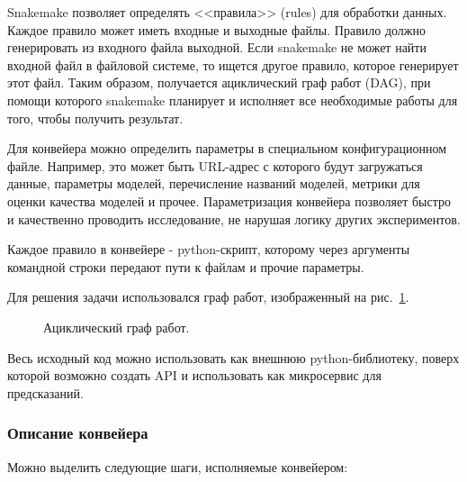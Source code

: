 \documentclass[a4paper,article,14pt]{extarticle}
\begin{document}
Snakemake позволяет определять <<правила>> (rules) для обработки данных.
Каждое правило может иметь входные и выходные файлы.
Правило должно генерировать из входного файла выходной.
Если snakemake не может найти входной файл в файловой системе, то ищется другое правило, которое генерирует этот файл.
Таким образом, получается ациклический граф работ (DAG), при помощи которого snakemake планирует и исполняет все необходимые работы для того, чтобы получить результат.
\par

Для конвейера можно определить параметры в специальном конфигурационном файле.
Например, это может быть URL-адрес с которого будут загружаться данные, параметры моделей, перечисление названий моделей, метрики для оценки качества моделей и прочее.
Параметризация конвейера позволяет быстро и качественно проводить исследование, не нарушая логику других экспериментов.
\par

Каждое правило в конвейере - python-скрипт, которому через аргументы командной строки передают пути к файлам и прочие параметры.
\par

Для решения задачи использовался граф работ, изображенный на рис.~\ref{graph_dag}.
\begin{figure}[ht]
    \begin{center}
        \caption{
            \label{graph_dag}
                 Ациклический граф работ.
        }
    \end {center}
\end {figure}

\par
Весь исходный код можно использовать как внешнюю python-библиотеку, поверх которой возможно создать API и использовать как микросервис для предсказаний.

\subsubsection{Описание конвейера}
Можно выделить следующие шаги, исполняемые конвейером:
\end{document}

